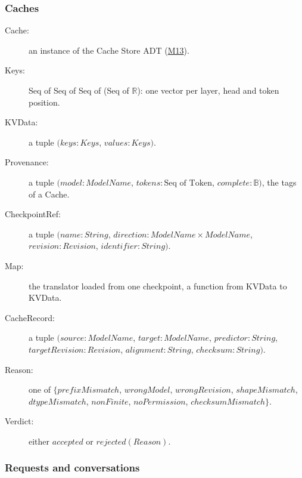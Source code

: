 \documentclass[12pt, titlepage]{article}
\begin{document}
\subsubsection*{Caches}

\begin{description}
\item[Cache:] an instance of the Cache Store ADT (\hyperref[mCache]{M13}).
\item[Keys:] Seq of Seq of Seq of (Seq of $\mathbb{R}$): one vector per layer, head
  and token position.
\item[KVData:] a tuple $(\mathit{keys}: \mathit{Keys}$, $\mathit{values}: \mathit{Keys})$.
\item[Provenance:] a tuple $(\mathit{model}: \mathit{ModelName}$, $\mathit{tokens}:
  \text{Seq of Token}$, $\mathit{complete}: \mathbb{B})$, the tags of a Cache.
\item[CheckpointRef:] a tuple $(\mathit{name}: \mathit{String}$, $\mathit{direction}:
  \mathit{ModelName} \times \mathit{ModelName}$, $\mathit{revision}: \mathit{Revision}$, $\mathit{identifier}: \mathit{String})$.
\item[Map:] the translator loaded from one checkpoint, a function from KVData to
  KVData.
\item[CacheRecord:] a tuple $(\mathit{source}: \mathit{ModelName}$, $\mathit{target}:
  \mathit{ModelName}$, $\mathit{predictor}: \mathit{String}$, $\mathit{targetRevision}:
  \mathit{Revision}$, $\mathit{alignment}: \mathit{String}$, $\mathit{checksum}: \mathit{String})$.
\item[Reason:] one of $\{\mathit{prefixMismatch}$, $\mathit{wrongModel}$, $\mathit{wrongRevision}$, $\mathit{shapeMismatch}$, $\mathit{dtypeMismatch}$, $\mathit{nonFinite}$, $\mathit{noPermission}$, $\mathit{checksumMismatch}\}$.
\item[Verdict:] either $\mathit{accepted}$ or $\mathit{rejected}(\mathit{Reason})$.
\end{description}

\subsubsection*{Requests and conversations}
\end{document}
